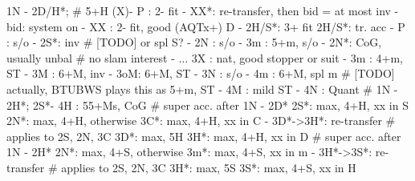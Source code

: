 1N - 2D/H*;  # 5+H
(X)- P  : 2- fit
        - XX*: re-transfer, then bid = at most inv
        - bid: system on
   - XX : 2- fit, good (AQTx+) D
   - 2H/S*: 3+ fit
2H/S*: tr. acc
     - P  : s/o
     - 2S*: inv  # [TODO] or spl S?
          - 2N : s/o
              - 3m : 5+m, s/o
     - 2N*: CoG, usually unbal  # no slam interest
          - ... 3X : nat, good stopper or suit
     - 3m : 4+m, ST
     - 3M : 6+M, inv
     - 3oM: 6+M, ST
     - 3N : s/o
     - 4m : 6+M, spl m  # [TODO] actually, BTUBWS plays this as 5+m, ST
     - 4M : mild ST
     - 4N : Quant
# 1N - 2H*; 2S*- 4H : 55+Ms, CoG
# super acc. after 1N - 2D*
2S*: max, 4+H, xx in S
2N*: max, 4+H, otherwise
3C*: max, 4+H, xx in C
   - 3D*->3H*: re-transfer  # applies to 2S, 2N, 3C
3D*: max, 5H
3H*: max, 4+H, xx in D
# super acc. after 1N - 2H*
2N*: max, 4+S, otherwise
3m*: max, 4+S, xx in m
   - 3H*->3S*: re-transfer  # applies to 2S, 2N, 3C
3H*: max, 5S
3S*: max, 4+S, xx in H

